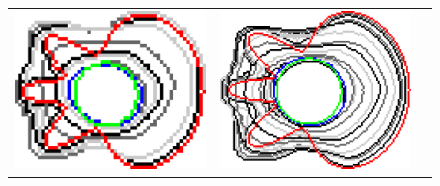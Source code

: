 \begin{figure}[hp!]
\begin{tabular}{ccc}
	
	\includegraphics[scale=0.25]{figures/chapter5/flow/flower/radius_5/ii/elastica/len_pen_0.01000/jonctions_1/best/gs_1.00000/summary.pdf} &		
	
	\includegraphics[scale=0.25]{figures/chapter5/flow/flower/radius_5/ii/elastica/len_pen_0.01000/jonctions_1/best/gs_0.50000/summary.pdf} &


\end{tabular}
\end{figure}
